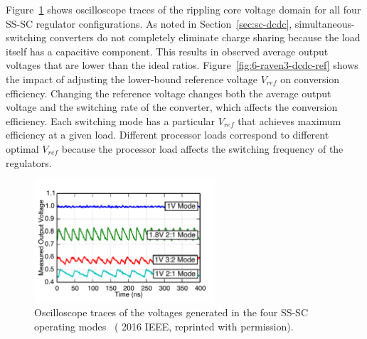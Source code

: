 \documentclass[graybox]{svmult}
\begin{document}
%
%
Figure~\ref{fig:6-raven3-dcdc-waveforms} shows oscilloscope traces of the rippling core voltage domain for all four SS-SC regulator configurations.
As noted in Section~\ref{sec:sc-dcdc}, simultaneous-switching converters do not completely eliminate charge sharing because the load itself has a capacitive component.
This results in observed average output voltages that are lower than the ideal ratios.
Figure~\ref{fig:6-raven3-dcdc-ref} shows the impact of adjusting the lower-bound reference voltage $V_{ref}$ on conversion efficiency.
Changing the reference voltage changes both the average output voltage and the switching rate of the converter, which affects the conversion efficiency.
Each switching mode has a particular $V_{ref}$ that achieves maximum efficiency at a given load.
Different processor loads correspond to different optimal $V_{ref}$ because the processor load affects the switching frequency of the regulators.

\begin{figure}
  \centering
  \includegraphics[width=0.6\textwidth]{6-raven3-dcdc-waveforms}
  \caption{Oscilloscope traces of the voltages generated in the four SS-SC operating modes~\cite{Zimmer2016} ({\textcopyright} 2016 IEEE, reprinted with permission).}
  \label{fig:6-raven3-dcdc-waveforms}
\end{figure}
\end{document}
